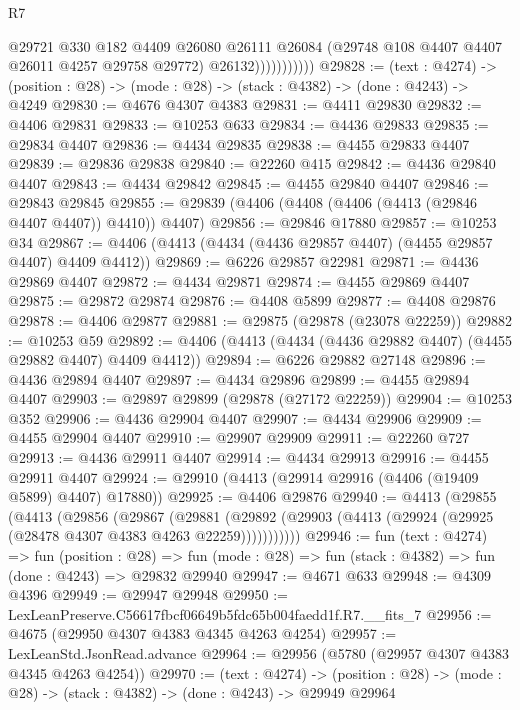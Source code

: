 \begin{lexlean}{R7}
\begin{coremodule}
                        @29721
                          @330
                          @182
                          @4409
                          @26080
                          @26111
                          @26084
                          (@29748 @108 @4407 @4407 @26011 @4257 @29758 @29772)
                          @26132)))))))))))
@29828 := (text : @4274) ->
  (position : @28) -> (mode : @28) -> (stack : @4382) -> (done : @4243) -> @4249
@29830 := @4676 @4307 @4383
@29831 := @4411 @29830
@29832 := @4406 @29831
@29833 := @10253 @633
@29834 := @4436 @29833
@29835 := @29834 @4407
@29836 := @4434 @29835
@29838 := @4455 @29833 @4407
@29839 := @29836 @29838
@29840 := @22260 @415
@29842 := @4436 @29840 @4407
@29843 := @4434 @29842
@29845 := @4455 @29840 @4407
@29846 := @29843 @29845
@29855 := @29839 (@4406 (@4408 (@4406 (@4413 (@29846 @4407 @4407)) @4410)) @4407)
@29856 := @29846 @17880
@29857 := @10253 @34
@29867 := @4406 (@4413 (@4434 (@4436 @29857 @4407) (@4455 @29857 @4407) @4409 @4412))
@29869 := @6226 @29857 @22981
@29871 := @4436 @29869 @4407
@29872 := @4434 @29871
@29874 := @4455 @29869 @4407
@29875 := @29872 @29874
@29876 := @4408 @5899
@29877 := @4408 @29876
@29878 := @4406 @29877
@29881 := @29875 (@29878 (@23078 @22259))
@29882 := @10253 @59
@29892 := @4406 (@4413 (@4434 (@4436 @29882 @4407) (@4455 @29882 @4407) @4409 @4412))
@29894 := @6226 @29882 @27148
@29896 := @4436 @29894 @4407
@29897 := @4434 @29896
@29899 := @4455 @29894 @4407
@29903 := @29897 @29899 (@29878 (@27172 @22259))
@29904 := @10253 @352
@29906 := @4436 @29904 @4407
@29907 := @4434 @29906
@29909 := @4455 @29904 @4407
@29910 := @29907 @29909
@29911 := @22260 @727
@29913 := @4436 @29911 @4407
@29914 := @4434 @29913
@29916 := @4455 @29911 @4407
@29924 := @29910 (@4413 (@29914 @29916 (@4406 (@19409 @5899) @4407) @17880))
@29925 := @4406 @29876
@29940 := @4413
    (@29855
      (@4413
        (@29856
          (@29867
            (@29881
              (@29892 (@29903 (@4413 (@29924 (@29925 (@28478 @4307 @4383 @4263 @22259)))))))))))
@29946 := fun (text : @4274) =>
  fun (position : @28) =>
  fun (mode : @28) => fun (stack : @4382) => fun (done : @4243) => @29832 @29940
@29947 := @4671 @633
@29948 := @4309 @4396
@29949 := @29947 @29948
@29950 := LexLeanPreserve.C56617fbcf06649b5fdc65b004faedd1f.R7.__fits_7
@29956 := @4675 (@29950 @4307 @4383 @4345 @4263 @4254)
@29957 := LexLeanStd.JsonRead.advance
@29964 := @29956 (@5780 (@29957 @4307 @4383 @4345 @4263 @4254))
@29970 := (text : @4274) ->
  (position : @28) -> (mode : @28) -> (stack : @4382) -> (done : @4243) -> @29949 @29964

\end{coremodule}
\end{lexlean}
